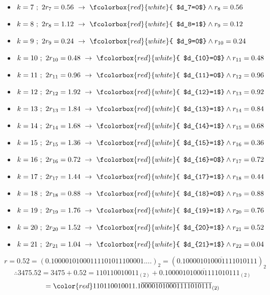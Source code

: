 \documentclass[8pt]{beamer}
\begin{document}
	\begin{frame}
		\begin{itemize}
			\item	$k=7 \  ; \ 2r_7=0.56  \ \rightarrow \ \fcolorbox{red}{white}{ $d_7=0$} \wedge r_8=0.56$
			\item[]	$k=8 \  ; \ 2r_8=1.12  \ \rightarrow \ \fcolorbox{red}{white}{ $d_8=1$} \wedge r_9=0.12$
			\item[]	$k=9 \  ; \ 2r_9=0.24  \ \rightarrow \ \fcolorbox{red}{white}{ $d_9=0$} \wedge r_{10}=0.24$
			\item[]	$k=10 \  ; \ 2r_{10}=0.48  \ \rightarrow \ \fcolorbox{red}{white}{ $d_{10}=0$} \wedge r_{11}=0.48$
			\item[]	$k=11 \  ; \ 2r_{11}=0.96  \ \rightarrow \ \fcolorbox{red}{white}{ $d_{11}=0$} \wedge r_{12}=0.96$
			\item[]	$k=12 \  ; \ 2r_{12}=1.92  \ \rightarrow \ \fcolorbox{red}{white}{ $d_{12}=1$} \wedge r_{13}=0.92$
			\item[]	$k=13 \  ; \ 2r_{13}=1.84  \ \rightarrow \ \fcolorbox{red}{white}{ $d_{13}=1$} \wedge r_{14}=0.84$
			\item[]	$k=14 \  ; \ 2r_{14}=1.68  \ \rightarrow \ \fcolorbox{red}{white}{ $d_{14}=1$} \wedge r_{15}=0.68$
			\item[]	$k=15 \  ; \ 2r_{15}=1.36  \ \rightarrow \ \fcolorbox{red}{white}{ $d_{15}=1$} \wedge r_{16}=0.36$
			\item[]	$k=16 \  ; \ 2r_{16}=0.72  \ \rightarrow \ \fcolorbox{red}{white}{ $d_{16}=0$} \wedge r_{17}=0.72$
			\item[]	$k=17 \  ; \ 2r_{17}=1.44  \ \rightarrow \ \fcolorbox{red}{white}{ $d_{17}=1$} \wedge r_{18}=0.44$
			\item[]	$k=18 \  ; \ 2r_{18}=0.88  \ \rightarrow \ \fcolorbox{red}{white}{ $d_{18}=0$} \wedge r_{19}=0.88$
			\item[]	$k=19 \  ; \ 2r_{19}=1.76  \ \rightarrow \ \fcolorbox{red}{white}{ $d_{19}=1$} \wedge r_{20}=0.76$
			\item[]	$k=20 \  ; \ 2r_{20}=1.52  \ \rightarrow \ \fcolorbox{red}{white}{ $d_{20}=1$} \wedge r_{21}=0.52$
			\item[]	$k=21 \  ; \ 2r_{21}=1.04  \ \rightarrow \ \fcolorbox{red}{white}{ $d_{21}=1$} \wedge r_{22}=0.04$
		\end{itemize}
	\end{frame}
	\begin{frame}
		$$r=0.52 = (0.10000101000111101011100001....)_2=(0.1\overline{00001010001111010111})_2$$
		$$\therefore 3475.52=3475+0.52=110110010011_{(2)} + 0.1\overline{00001010001111010111}_{(2)}$$
			$$= \color{red}110110010011.1\overline{00001010001111010111}_{(2)} $$
	\end{frame}
\end{document}
